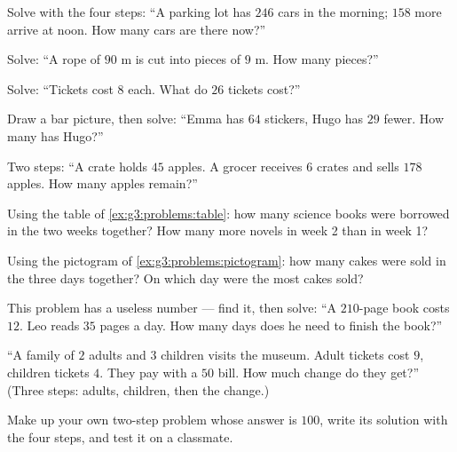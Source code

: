 \begin{exercise}[$\star$]\label{exo:g3:problems:2}
Solve with the four steps: ``A parking lot has $246$ cars in the
morning; $158$ more arrive at noon. How many cars are there now?''
\end{exercise}

\begin{exercise}[$\star$]\label{exo:g3:problems:3}
Solve: ``A rope of $90$ m is cut into pieces of $9$ m. How many
pieces?''
\end{exercise}

\begin{exercise}[$\star$]\label{exo:g3:problems:4}
Solve: ``Tickets cost $8$ each. What do $26$ tickets cost?''
\end{exercise}

\begin{exercise}[$\star$]\label{exo:g3:problems:5}
Draw a bar picture, then solve: ``Emma has $64$ stickers, Hugo has
$29$ fewer. How many has Hugo?''
\end{exercise}

\begin{exercise}[$\star$]\label{exo:g3:problems:6}
Two steps: ``A crate holds $45$ apples. A grocer receives $6$ crates
and sells $178$ apples. How many apples remain?''
\end{exercise}

\begin{exercise}[$\star$]\label{exo:g3:problems:7}
Using the table of \cref{ex:g3:problems:table}: how many science
books were borrowed in the two weeks together? How many more novels
in week 2 than in week 1?
\end{exercise}

\begin{exercise}[$\star$]\label{exo:g3:problems:8}
Using the pictogram of \cref{ex:g3:problems:pictogram}: how many
cakes were sold in the three days together? On which day were the
most cakes sold?
\end{exercise}

\begin{exercise}[$\star$]\label{exo:g3:problems:9}
This problem has a useless number --- find it, then solve: ``A
$210$-page book costs $12$. Leo reads $35$ pages a day. How many
days does he need to finish the book?''
\end{exercise}

\begin{exercise}[$\star\star$]\label{exo:g3:problems:10}
``A family of $2$ adults and $3$ children visits the museum. Adult
tickets cost $9$, children tickets $4$. They pay with a $50$ bill.
How much change do they get?'' (Three steps: adults, children, then
the change.)
\end{exercise}

\begin{exercise}[$\star\star$]\label{exo:g3:problems:11}
Make up your own two-step problem whose answer is $100$, write its
solution with the four steps, and test it on a classmate.
\end{exercise}
